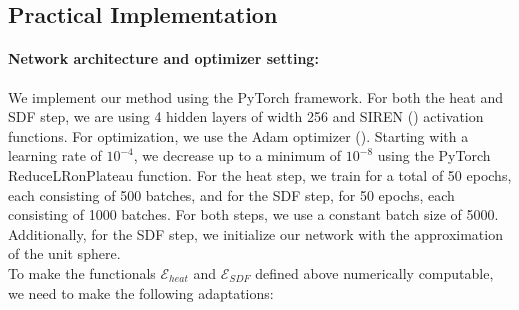 \documentclass[draft,12pt,openany]{book}
\theoremstyle{plainnormal}
\theoremstyle{remark}
\begin{document}
\subsection{Practical Implementation}\label{practicalImplememntation}
\paragraph{Network architecture and optimizer setting:} We implement our method using the PyTorch framework. For both the heat and SDF step, we are using 4 hidden layers of width 256 and SIREN (\cite{sitzmann2020implicitneuralrepresentationsperiodic}) activation functions. For optimization, we use the Adam optimizer (\cite{kingma2017adammethodstochasticoptimization}). Starting with a learning rate of $10^{-4}$, we decrease up to a minimum of $10^{-8}$ using the PyTorch ReduceLRonPlateau function. For the heat step, we train for a total of 50 epochs, each consisting of 500 batches, and for the SDF step, for 50 epochs, each consisting of 1000 batches. For both steps, we use a constant batch size of 5000. Additionally, for the SDF step, we initialize our network with the approximation of the unit sphere. \\
To make the functionals $\mathcal{E}_{heat}$ and $\mathcal{E}_{SDF}$ defined above numerically computable, we need to make the following adaptations:
\end{document}
